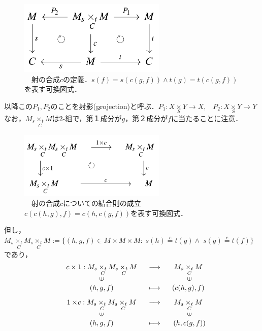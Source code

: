 \documentclass[uplatex, 12pt, a4paper, dvipdfmx]{jsarticle}
\begin{document}
\begin{figure}[ht] \begin{center}  \caption{\label{def-cd:1}　射の合成$c$の定義．$s(f)=s(c(g,f))\wedge t(g)=t(c(g,f))$を表す可換図式．}
    \includegraphics[width=7cm]{cd-1.png}
\end{center}\end{figure}
以降この$P_1, P_2$のことを射影(\underline{p}rojection)と呼ぶ．\hspace{6mm}$P_1: X\underset{S}{\times}Y \longrightarrow X, \; \; \; P_2: X\underset{S}{\times}Y \longrightarrow Y$\\
なお，$M_s\underset{C}{\times_t}M$は2-組で，第１成分が$g$，第２成分が$f$に当たることに注意．

\begin{figure}[ht] \begin{center}  \caption{\label{def-cd:2}　射の合成$c$についての結合則の成立$c(c(h,g),f)=c(h,c(g,f))$を表す可換図式．}
    \includegraphics[width=7cm]{cd-2.png}
\end{center}\end{figure}
但し，$M_s \underset{C}{\times_t}M_s \underset{C}{\times_t}M := \{ (h,g,f)\in M\times M\times M : \; s(h)\overset{c}{=} t(g) \wedge \; s(g) \overset{c}{=} t(f) \}$であり，$$\begin{array}{ccc}
        c\times1:M_s\underset{C}{\times_t}M_s\underset{C}{\times_t}M & \longrightarrow & M_s\underset{C}{\times_t}M \\
        \rotatebox{90}{$\in$} & & \rotatebox{90}{$\in$}\\
        (h,g,f) & \longmapsto & (c(h,g),f) \\[3mm]
        1\times \! c:M_s\underset{C}{\times_t}M_s\underset{C}{\times_t}M & \longrightarrow & M_s\underset{C}{\times_t}M \\
        \rotatebox{90}{$\in$} & & \rotatebox{90}{$\in$}\\
        (h,g,f) & \longmapsto & (h,c(g,f))
\end{array}$$
\end{document}
